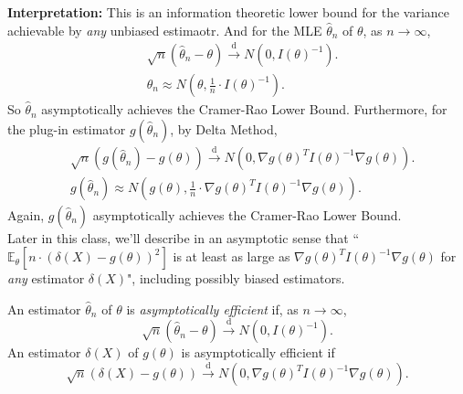 \documentclass[a4paper]{article}
\begin{document}
\noindent \textbf{Interpretation:} This is an information theoretic lower bound for the variance achievable by \emph{any} unbiased estimaotr. And for the MLE $\hat{\theta}_n$ of $\theta$, as $n \to \infty$,
\begin{equation*}
	\begin{aligned}
		& \sqrt{n} (\hat{\theta}_n - \theta) \stackrel{\text{d}}{\longrightarrow} N \left(0,I(\theta)^{-1}\right). \\
		& \hat{\theta}_n \approx N\left(\theta,\frac{1}{n} \cdot I(\theta)^{-1}\right).
	\end{aligned}
\end{equation*} 
So $\hat{\theta}_n$ asymptotically achieves the Cramer-Rao Lower Bound. Furthermore, for the plug-in estimator $g(\hat{\theta}_n)$, by Delta Method,
\begin{equation*}
	\begin{aligned}
		& \sqrt{n}(g(\hat{\theta}_n) - g(\theta)) \stackrel{\text{d}}{\longrightarrow} N\left(0,\nabla g(\theta)^T I(\theta)^{-1} \nabla g(\theta)\right). \\
		& g(\hat{\theta}_n) \approx N\left(g(\theta),\frac{1}{n} \cdot \nabla g(\theta)^T I(\theta)^{-1} \nabla g(\theta)\right).
	\end{aligned}
\end{equation*} 
Again, $g(\hat{\theta}_n)$ asymptotically achieves the Cramer-Rao Lower Bound.\\

\noindent Later in this class, we'll describe in an asymptotic sense that ``$\mathbb{E}_{\theta}[n \cdot (\delta(X)-g(\theta))^2]$ is at least as large as $\nabla g(\theta)^T I(\theta)^{-1} \nabla g(\theta)$ for \emph{any} estimator $\delta(X)$", including possibly biased estimators.

\begin{defi}
	An estimator $\hat{\theta}_n$ of $\theta$ is \emph{asymptotically efficient} if, as $n \to \infty$,
	\begin{equation}
		\sqrt{n}(\hat{\theta}_n - \theta) \stackrel{\text{d}}{\longrightarrow} N(0,I(\theta)^{-1}).
	\end{equation}
	An estimator $\delta(X)$ of $g(\theta)$ is asymptotically efficient if
	\begin{equation}
		\sqrt{n}(\delta(X)-g(\theta)) \stackrel{\text{d}}{\longrightarrow} N\left(0,\nabla g(\theta)^T I(\theta)^{-1} \nabla g(\theta)\right).
	\end{equation}
\end{defi}
\end{document}
